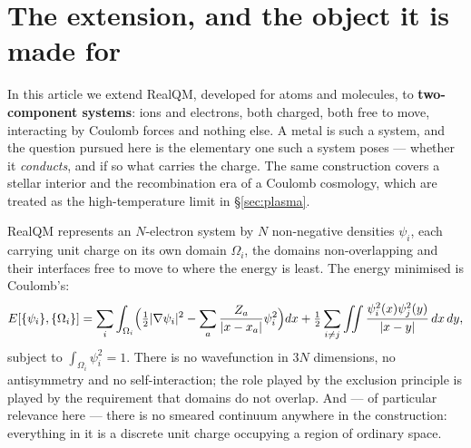 \documentclass[11pt]{article}
\newcommand{\grad}{\nabla}
\newcommand{\half}{\tfrac12}
\begin{document}
\begin{abstract}
Two further results bound the framework. The interface coefficient vanishes exactly, $C=0$, removing
degeneracy pressure and leaving a vanishing screening length and a dispersionless plasmon; a Robin
condition at $\beta a=1.146$ restores $C=C_{\rm TF}$, but $\beta$ that large \emph{unbinds}
$\mathrm{H}_2$, which fails by $\beta a\approx0.71$ --- so the equation of state and molecular
binding appear not to be repairable together, while double occupancy, the repair conduction needs
at half filling, becomes favourable at $\beta a=0.451$. And against density-functional
theory and exact full configuration interaction on the same chains, the framework errs by
\textbf{over-localising} --- in bond length and in pinning alike --- which is the direction
$U\to\infty$ implies, so it fails as its own analysis says it should rather than arbitrarily.
\end{abstract}


\section{The extension, and the object it is made for}

In this article we extend RealQM, developed for atoms and molecules, to \textbf{two-component
systems}: ions and electrons, both charged, both free to move, interacting by Coulomb forces and
nothing else. A metal is such a system, and the question pursued here is the elementary one such a
system poses --- whether it \emph{conducts}, and if so what carries the charge. The same
construction covers a stellar interior and the recombination era of a Coulomb cosmology, which are
treated as the high-temperature limit in \S\ref{sec:plasma}.

RealQM \cite{realqm,realqmbook} represents an $N$-electron system by $N$ non-negative densities
$\psi_i$, each carrying unit charge on its own domain $\Omega_i$, the domains non-overlapping and
their interfaces free to move to where the energy is least. The energy minimised is Coulomb's:
\begin{equation}\label{eq:E}
E[\{\psi_i\},\{\Omega_i\}]=\sum_i\int_{\Omega_i}\Bigl(\half|\grad\psi_i|^2
-\sum_a\frac{Z_a}{|x-x_a|}\psi_i^2\Bigr)dx
+\half\sum_{i\neq j}\iint\frac{\psi_i^2(x)\psi_j^2(y)}{|x-y|}\,dx\,dy,
\end{equation}
subject to $\int_{\Omega_i}\psi_i^2=1$. There is no wavefunction in $3N$ dimensions, no
antisymmetry and no self-interaction; the role played by the exclusion principle is played by the
requirement that domains do not overlap. And --- of particular relevance here --- there is no smeared
continuum anywhere in the construction: everything in it is a discrete unit charge occupying a region
of ordinary space.
\end{document}
